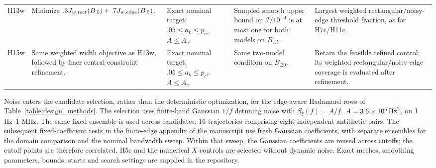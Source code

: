 {\begin{longtable}{>{\raggedright\arraybackslash}p{1.9cm}>{\raggedright\arraybackslash}p{5.6cm}>{\raggedright\arraybackslash}p{5.3cm}>{\raggedright\arraybackslash}p{4.7cm}>{\raggedright\arraybackslash}p{7.4cm}}
H13w & Minimize $.3J_{w,\rm rect}(B_{.5})+.7J_{w,\rm edge}(B_{.5})$. & Exact nominal target; $.05\leq a_k\leq p_c$, $A\leq A_c$. & Sampled smooth upper bound on $\mathcal I/10^{-4}$ is at most one for both models on $B_{.15}$. & Largest weighted rectangular/noisy-edge threshold fraction, as for H7c/H11c. \\[2pt]
H15w & Same weighted width objective as H13w, followed by finer central-constraint refinement. & Exact nominal target; $.05\leq a_k\leq p_c$, $A\leq A_c$. & Same two-model condition on $B_{.20}$. & Retain the feasible refined control; its weighted rectangular/noisy-edge coverage is evaluated after refinement. \\
\end{longtable}}


Noise enters the candidate selection, rather than the deterministic optimization, for the edge-aware Hadamard rows of Table~\ref{table:design_methods}. The selection uses finite-band Gaussian $1/f$ detuning noise with $S_\xi(f)=A/f$, $A=3.6\times10^5\,{\rm Hz}^2$, on 1 Hz--1 MHz. The same fixed ensemble is used across candidates: 16 trajectories comprising eight independent antithetic pairs. The subsequent fixed-coefficient tests in the finite-edge appendix of the manuscript use fresh Gaussian coefficients, with separate ensembles for the domain comparison and the nominal bandwidth sweep. Within that sweep, the Gaussian coefficients are reused across cutoffs; the cutoff points are therefore correlated. H5c and the numerical $X$ controls are selected without dynamic noise. Exact meshes, smoothing parameters, bounds, starts and search settings are supplied in the repository.


